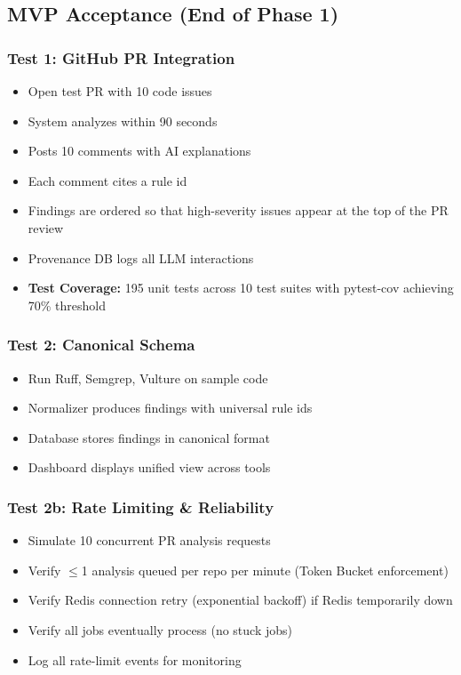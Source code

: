 \documentclass[11pt,a4paper]{article}
\begin{document}
\subsection{MVP Acceptance (End of Phase 1)}

\subsubsection{Test 1: GitHub PR Integration}
\begin{itemize}[leftmargin=*]
    \item Open test PR with 10 code issues
    \item System analyzes within 90 seconds
    \item Posts 10 comments with AI explanations
    \item Each comment cites a rule id
    \item Findings are ordered so that high-severity issues appear at the top of the PR review
    \item Provenance DB logs all LLM interactions
    \item \textbf{Test Coverage:} 195 unit tests across 10 test suites with pytest-cov achieving 70\% threshold
\end{itemize}

\subsubsection{Test 2: Canonical Schema}
\begin{itemize}[leftmargin=*]
    \item Run Ruff, Semgrep, Vulture on sample code
    \item Normalizer produces findings with universal rule ids
    \item Database stores findings in canonical format
    \item Dashboard displays unified view across tools
\end{itemize}

\subsubsection{Test 2b: Rate Limiting \& Reliability}
\begin{itemize}[leftmargin=*]
    \item Simulate 10 concurrent PR analysis requests
    \item Verify $\leq$1 analysis queued per repo per minute (Token Bucket enforcement)
    \item Verify Redis connection retry (exponential backoff) if Redis temporarily down
    \item Verify all jobs eventually process (no stuck jobs)
    \item Log all rate-limit events for monitoring
\end{itemize}
\end{document}
